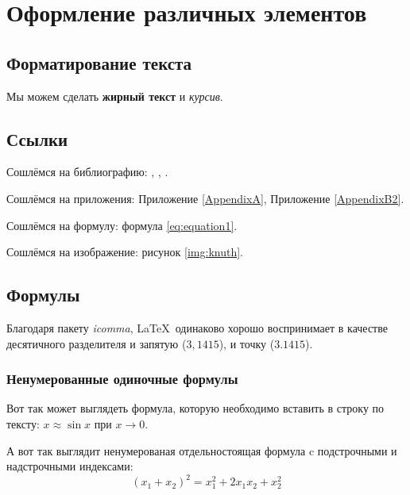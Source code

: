 \chapter{Оформление различных элементов} \label{chapt1}

\section{Форматирование текста} \label{sect1_1}

Мы можем сделать \textbf{жирный текст} и \textit{курсив}.


\section{Ссылки} \label{sect1_2}
Сошлёмся на библиографию: \cite{bib1}, \cite{bib2}, \cite{bib3,bib4,bib5}.

Сошлёмся на приложения: Приложение \ref{AppendixA}, Приложение \ref{AppendixB2}.

Сошлёмся на формулу: формула \eqref{eq:equation1}.

Сошлёмся на изображение: рисунок \ref{img:knuth}.


\section{Формулы} \label{sect1_3}

Благодаря пакету \textit{icomma}, \LaTeX~одинаково хорошо воспринимает в качестве десятичного разделителя и запятую ($3,1415$), и точку ($3.1415$).

\subsection{Ненумерованные одиночные формулы} \label{subsect1_3_1}

Вот так может выглядеть формула, которую необходимо вставить в строку по тексту: $x \approx \sin x$ при $x \to 0$.

А вот так выглядит ненумерованая отдельностоящая формула c подстрочными и надстрочными индексами:
$$
(x_1+x_2)^2 = x_1^2 + 2 x_1 x_2 + x_2^2
$$

